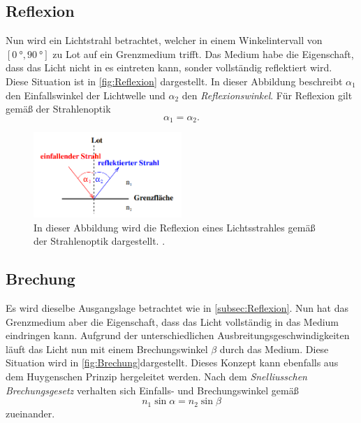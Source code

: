 \subsection{Reflexion}
\label{subsec:Reflexion}
Nun wird ein Lichtstrahl betrachtet, welcher in einem Winkelintervall von $[\qty{0}{\degree},\qty{90}{\degree}]$ zu Lot auf ein Grenzmedium trifft. Das Medium habe die 
Eigenschaft, dass das Licht nicht in es eintreten kann, sonder vollständig reflektiert wird. Diese Situation ist in \autoref{fig:Reflexion} dargestellt. In dieser Abbildung
beschreibt $\alpha_1$ den Einfallswinkel der Lichtwelle und $\alpha_2$ den \textit{Reflexionswinkel}. Für Reflexion gilt gemäß der Strahlenoptik 
\begin{equation}
  \label{eqn:Reflexionsgesetz}
  \alpha_1 = \alpha_2.
\end{equation}

\begin{figure}
  \centering
  \includegraphics[width=0.5\textwidth]{content/Reflexion.png}
  \caption{In dieser Abbildung wird die Reflexion eines Lichtsstrahles gemäß der Strahlenoptik dargestellt. \cite{v400}.}
  \label{fig:Reflexion}
\end{figure}

\subsection{Brechung}
\label{subsec:Brechung}
Es wird dieselbe Ausgangslage betrachtet wie in \autoref{subsec:Reflexion}. Nun hat das Grenzmedium aber die Eigenschaft, dass das Licht vollständig in das Medium eindringen
kann. Aufgrund der unterschiedlichen Ausbreitungsgeschwindigkeiten läuft das Licht nun mit einem Brechungswinkel $\beta$ durch das Medium. Diese Situation wird in 
\autoref{fig:Brechung}dargestellt. Dieses Konzept kann ebenfalls aus dem 
Huygenschen Prinzip hergeleitet werden. Nach dem \textit{Snelliusschen Brechungsgesetz} verhalten sich Einfalls- und Brechungswinkel gemäß
\begin{equation}
  \label{eqn:Brechungsgesetz}
  n_1\sin\alpha = n_2\sin\beta
\end{equation}
zueinander.

